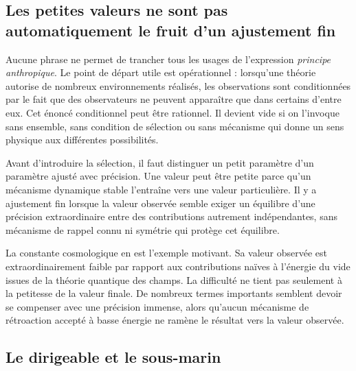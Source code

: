 \subsection{Les petites valeurs ne sont pas automatiquement le fruit d’un ajustement fin}

Aucune phrase ne permet de trancher tous les usages de l’expression \emph{principe anthropique}. Le point de départ utile est opérationnel : lorsqu’une théorie autorise de nombreux environnements réalisés, les observations sont conditionnées par le fait que des observateurs ne peuvent apparaître que dans certains d’entre eux. Cet énoncé conditionnel peut être rationnel. Il devient vide si on l’invoque sans ensemble, sans condition de sélection ou sans mécanisme qui donne un sens physique aux différentes possibilités.

Avant d’introduire la sélection, il faut distinguer un petit paramètre d’un paramètre ajusté avec précision. Une valeur peut être petite parce qu’un mécanisme dynamique stable l’entraîne vers une valeur particulière. Il y a ajustement fin lorsque la valeur observée semble exiger un équilibre d’une précision extraordinaire entre des contributions autrement indépendantes, sans mécanisme de rappel connu ni symétrie qui protège cet équilibre.

\begin{classroomqa}
\end{classroomqa}

La constante cosmologique en est l’exemple motivant. Sa valeur observée est extraordinairement faible par rapport aux contributions naïves à l’énergie du vide issues de la théorie quantique des champs. La difficulté ne tient pas seulement à la petitesse de la valeur finale. De nombreux termes importants semblent devoir se compenser avec une précision immense, alors qu’aucun mécanisme de rétroaction accepté à basse énergie ne ramène le résultat vers la valeur observée.

\subsection{Le dirigeable et le sous-marin}

